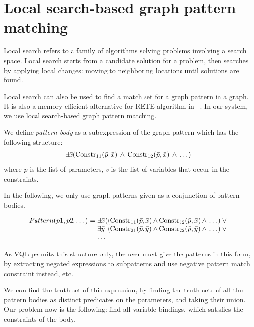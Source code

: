 \section{Local search-based graph pattern matching}

Local search refers to a family of algorithms solving problems involving a search space. 
Local search starts from a candidate solution for a problem, then searches by applying local changes: moving to neighboring locations until solutions are found.

Local search can also be used to find a match set for a graph pattern in a graph.
It is also a memory-efficient alternative for RETE algorithm in \viatra{}~\cite{bur-marton-msc}.
In our system, we use local search-based graph pattern matching. 

We define \emph{pattern body} as a subexpression of the graph pattern which has the following structure:
\begin{equation*}
\begin{array}{@{}c@{}}
\exists{\bar{x}} 
(\text{Constr}_{11}(\bar{p},\bar{x} ) \, \wedge \, 
 \text{Constr}_{12}(\bar{p},\bar{x} ) \, \wedge \, \dots{})
\end{array}
\end{equation*}
where $\bar{p}$ is the list of parameters, $\bar{v}$ is the list of variables that occur in the constraints.

In the following, we only use graph patterns given as a conjunction of pattern bodies.

\begin{equation*}
\begin{array}{@{}r@{}l@{}l@{}l@{}l@{}}
Pattern(p1, p2, \dots) = \;
& \exists{\bar{x}} ( & 
(\text{Constr}_{11}(\bar{p},\bar{x} ) & \, \wedge \, \text{Constr}_{12}(\bar{p},\bar{x} ) & \, \wedge \, \dots{}) \: \vee \\

& \exists{\bar{y}} & 
(\text{Constr}_{21}(\bar{p},\bar{y} ) & \, \wedge \, \text{Constr}_{22}(\bar{p},\bar{y} ) & \, \wedge \, \dots{}) \: \vee \\
& \dots{}
\end{array}
\end{equation*}

As VQL permits this structure only, the user must give the patterns in this form, by extracting negated expressions to subpatterns and use negative pattern match constraint instead, etc.

We can find the truth set of this expression, by finding the truth sets of all the pattern bodies as distinct predicates on the parameters, and taking their union.
Our problem now is the following: find all variable bindings, which satisfies the constraints of the body.

